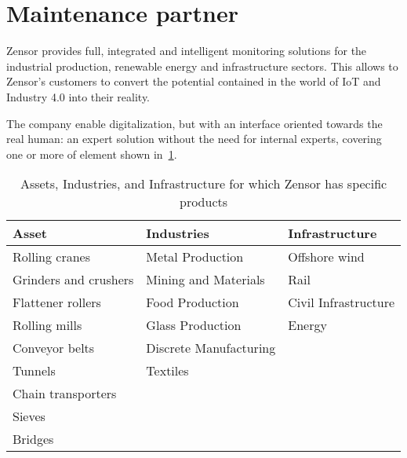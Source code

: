 
\section{Maintenance partner}
Zensor \cite{Misc:zensor_official_website} provides full, integrated and intelligent monitoring solutions for the industrial production, renewable energy and infrastructure sectors.
This allows to Zensor's customers to convert the potential contained in the world of \ac{IoT} and Industry 4.0 into their reality. 

The company enable digitalization, but with an interface oriented towards the real human: an expert solution without the need for internal experts, covering one or more of element shown in~\ref{tab:assets_zensors}.
\begin{table}[h]
    \begin{tabularx}{\textwidth}{l l l}
    \toprule
    Asset                 & Industries                       & Infrastructure                       \\ \midrule
    Rolling cranes        & Metal Production                 & Offshore wind                        \\
    Grinders and crushers & Mining and Materials             & Rail                                 \\
    Flattener rollers     & Food Production                  & Civil Infrastructure                 \\
    Rolling mills         & Glass Production                 & Energy                               \\
    Conveyor belts        & Discrete Manufacturing                                                  \\
    Tunnels               & Textiles                                                                \\
    Chain transporters    &                                                                         \\
    Sieves                &                                                                         \\
    Bridges               &                                                                         \\ \bottomrule
    \end{tabularx}
    \caption{Assets, Industries, and Infrastructure for which Zensor has specific products}
    \label{tab:assets_zensors}
\end{table}

